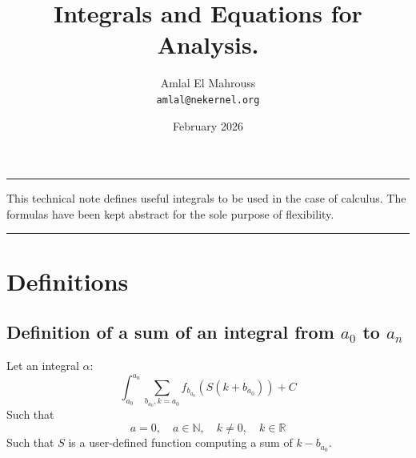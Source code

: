 \documentclass[11pt, a4paper]{article}
\title{Integrals and Equations for Analysis.}
\author{Amlal El Mahrouss\\\texttt{amlal@nekernel.org}}
\date{February 2026}
\begin{document}
\bf \maketitle

\begin{center}
	\rule[0.01cm]{17cm}{0.01cm}
\end{center}

\abstract
{
	This technical note defines useful integrals to be used in the case of calculus. The formulas have been kept abstract for the sole purpose of flexibility.
}

\begin{center}
	\rule[1cm]{17cm}{0.01cm}
\end{center}

\section{Definitions}

\subsection{Definition of a sum of an integral from $a_{0}$ to $a_{n}$}

Let an integral $\alpha$:
\begin{equation}
    \int_{a_{0}}^{a_{n}}\sum_{b_{a_{0}},k=a_{0}} f_{b_{a_{0}}}(S(k+b_{a_{0}})) + C
\end{equation}
Such that
\begin{equation}
    a = 0, \quad a \in \mathbb{N}, \quad k \neq 0, \quad k \in \mathbb{R}
\end{equation}
Such that $S$ is a user-defined function computing a sum of $k-b_{a_{0}}$.
\end{document}
